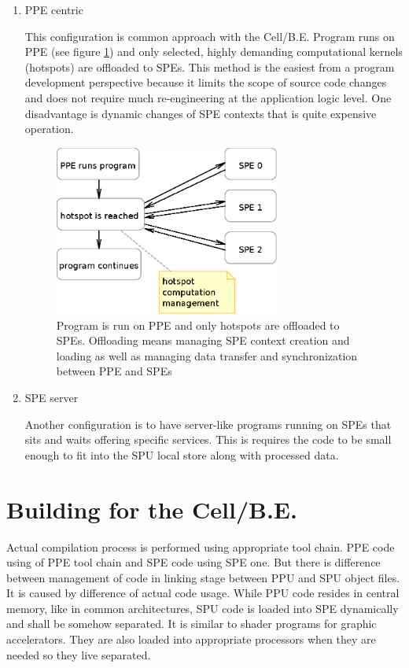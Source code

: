 \begin{enumerate}
\item PPE centric
\par
This configuration is common approach with the Cell/B.E.
Program runs on PPE (see figure \ref{fg:PPUCentricModel}) and only selected, highly demanding computational kernels (hotspots) are offloaded to SPEs.
This method is the easiest from a program development perspective because it limits the scope of source code changes and does not require much re-engineering at the application logic level.
One disadvantage is dynamic changes of SPE contexts that is quite expensive operation.

\begin{figure}
    \centering
    \includegraphics[width=0.7\textwidth]{data/PPUCentricModel}
    \caption[PPE centric configuration]{Program is run on PPE and only hotspots are offloaded to SPEs.
 Offloading means managing SPE context creation and loading as well as managing data transfer and synchronization between PPE and SPEs}
    \label{fg:PPUCentricModel}
\end{figure}

\item SPE server
\par
Another configuration is to have server-like programs running on SPEs that sits and waits offering specific services.
This is requires the code to be small enough to fit into the SPU local store along with processed data.

\end{enumerate}

\section {Building for the Cell/B.E.}
\par
Actual compilation process is performed using appropriate tool chain.
PPE code using of PPE tool chain and SPE code using SPE one.
But there is difference between management of code in linking stage between PPU and SPU object files.
It is caused by difference of actual code usage.
While PPU code resides in central memory, like in common architectures, SPU code is loaded into SPE dynamically and shall be somehow separated.
It is similar to shader programs for graphic accelerators.
They are also loaded into appropriate processors when they are needed so they live separated.

